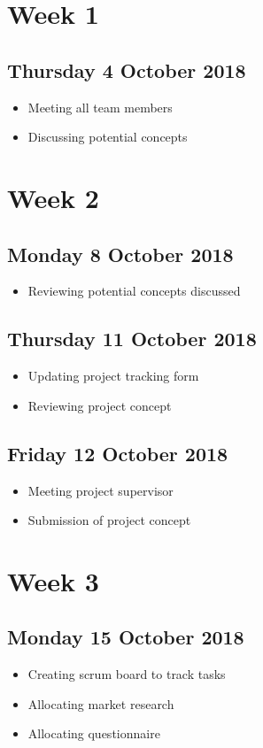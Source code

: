 \section*{Week 1}
\subsection*{Thursday 4 October 2018}
\begin{itemize}
	\item Meeting all team members
	\item Discussing potential concepts
\end{itemize}

\section*{Week 2}
\subsection*{Monday 8 October 2018}
\begin{itemize}
	\item Reviewing potential concepts discussed
\end{itemize}

\subsection*{Thursday 11 October 2018}
\begin{itemize}
	\item Updating project tracking form
	\item Reviewing project concept
\end{itemize}

\subsection*{Friday 12 October 2018}
\begin{itemize}
	\item Meeting project supervisor
	\item Submission of project concept
\end{itemize}

\section*{Week 3}
\subsection*{Monday 15 October 2018}
\begin{itemize}
	\item Creating scrum board to track tasks
	\item Allocating market research
	\item Allocating questionnaire
\end{itemize}

